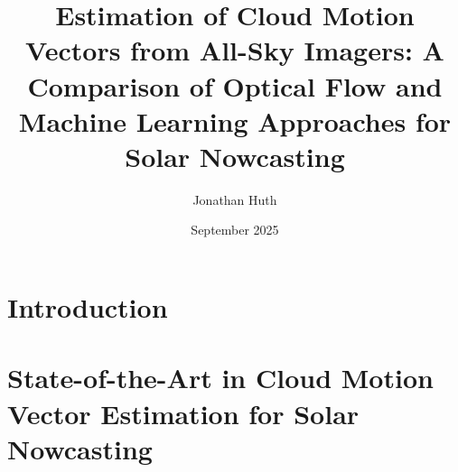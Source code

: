 \documentclass[a4paper,11pt,twoside]{book}
\title{Estimation of Cloud Motion Vectors from All-Sky Imagers: A Comparison of Optical Flow and Machine Learning Approaches for Solar Nowcasting}
\author{Jonathan Huth}
\date{September 2025}
\begin{document}

\maketitle
\thispagestyle{empty}
\cleardoublepage

\tableofcontents
\clearpage

\setcounter{page}{1}

\chapter{Introduction}

\clearpage

\chapter{State-of-the-Art in Cloud Motion Vector Estimation for Solar Nowcasting}

\clearpage

% 

\cleardoublepage
\renewcommand{\cftlistequationsname}{List of Equations}
\listoflistequations
\clearpage



\clearpage
\end{document}
